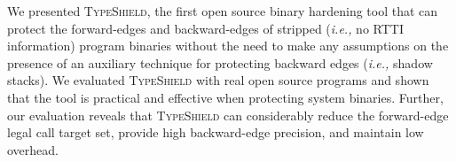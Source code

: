 
We presented \textsc{TypeShield}, the first open source binary 
hardening tool that can protect the forward-edges and backward-edges 
of stripped (\textit{i.e.,} no RTTI information) program binaries without the need to make any assumptions
on the presence of an auxiliary technique for protecting backward edges (\textit{i.e.,} shadow stacks). 
We evaluated
\textsc{TypeShield} with real open source programs and shown that the 
tool is practical and effective when protecting system binaries.
Further, our evaluation reveals that \textsc{TypeShield} can considerably reduce the forward-edge legal 
call target set, provide high backward-edge precision, and maintain low overhead.


